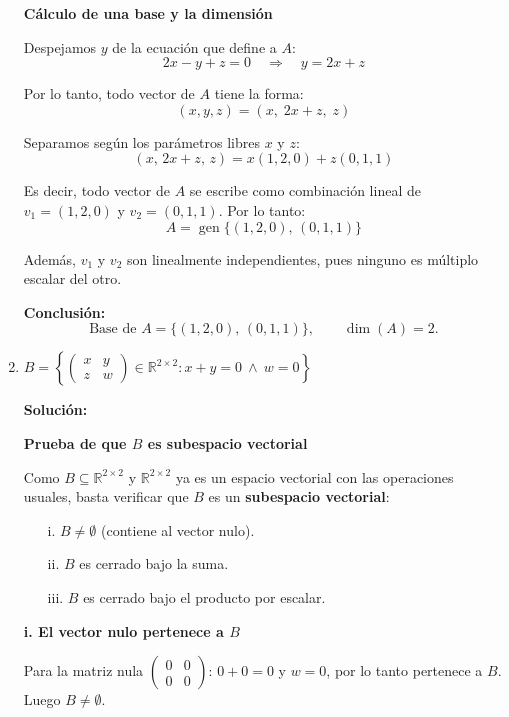 \documentclass[12pt]{article}
\newcommand{\solucion}{%
    \vspace{0.8em}%
    \textbf{Solución:}%
    \vspace{0.8em}%
}
\begin{document}
\begin{enumerate}[label=\alph*.-]
    \textbf{Cálculo de una base y la dimensión}

    Despejamos $y$ de la ecuación que define a $A$:
    \[
    2x-y+z=0 \quad \Longrightarrow \quad y = 2x+z
    \]

    Por lo tanto, todo vector de $A$ tiene la forma:
    \[
    (x,y,z) = (x,\; 2x+z,\; z)
    \]

    Separamos según los parámetros libres $x$ y $z$:
    \[
    (x,\, 2x+z,\, z) = x(1,2,0) + z(0,1,1)
    \]

    Es decir, todo vector de $A$ se escribe como combinación lineal de $v_1=(1,2,0)$ y $v_2=(0,1,1)$. Por lo tanto:
    \[
    A = \operatorname{gen}\{(1,2,0),\,(0,1,1)\}
    \]

    Además, $v_1$ y $v_2$ son linealmente independientes, pues ninguno es múltiplo escalar del otro.

    \textbf{Conclusión:}
    \[
    \text{Base de } A = \{(1,2,0),\,(0,1,1)\}, \qquad \dim(A) = 2.
    \]

    \item $B = \left\{ \begin{pmatrix} x & y \\ z & w \end{pmatrix} \in \mathbb{R}^{2\times2} : x + y = 0 \ \wedge\ w = 0 \right\}$

    \solucion

    \textbf{Prueba de que $B$ es subespacio vectorial}

    Como $B \subseteq \mathbb{R}^{2\times2}$ y $\mathbb{R}^{2\times2}$ ya es un espacio vectorial con las operaciones usuales, basta verificar que $B$ es un \textbf{subespacio vectorial}:

    \begin{enumerate}
        \item[i.] $B \neq \emptyset$ (contiene al vector nulo).
        \item[ii.] $B$ es cerrado bajo la suma.
        \item[iii.] $B$ es cerrado bajo el producto por escalar.
    \end{enumerate}

    \textbf{i. El vector nulo pertenece a $B$}

    Para la matriz nula $\begin{pmatrix}0&0\\0&0\end{pmatrix}$: $0+0=0$ y $w=0$, por lo tanto pertenece a $B$. Luego $B \neq \emptyset$.


\end{enumerate}
\end{document}
